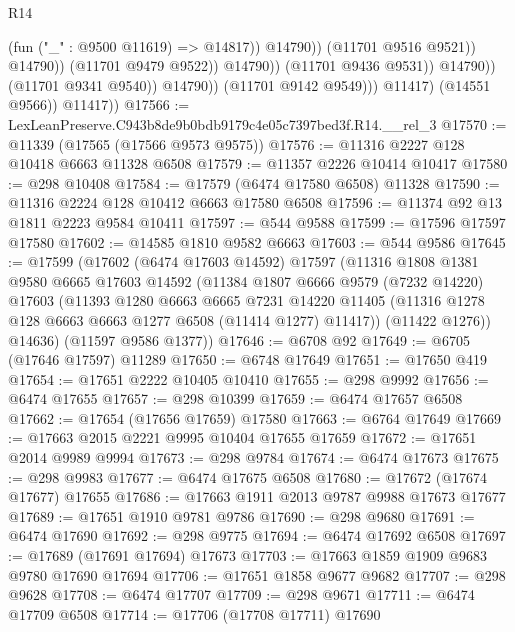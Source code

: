 \begin{lexlean}{R14}
\begin{coremodule}
                                              (fun ("_" : @9500 @11619) => @14817))
                                            @14790))
                                        (@11701 @9516 @9521))
                                      @14790))
                                  (@11701 @9479 @9522))
                                @14790))
                            (@11701 @9436 @9531))
                          @14790))
                      (@11701 @9341 @9540))
                    @14790))
                (@11701 @9142 @9549)))
            @11417)
          (@14551 @9566))
        @11417))
@17566 := LexLeanPreserve.C943b8de9b0bdb9179c4e05c7397bed3f.R14.__rel_3
@17570 := @11339 (@17565 (@17566 @9573 @9575))
@17576 := @11316 @2227 @128 @10418 @6663 @11328 @6508
@17579 := @11357 @2226 @10414 @10417
@17580 := @298 @10408
@17584 := @17579 (@6474 @17580 @6508) @11328
@17590 := @11316 @2224 @128 @10412 @6663 @17580 @6508
@17596 := @11374 @92 @13 @1811 @2223 @9584 @10411
@17597 := @544 @9588
@17599 := @17596 @17597 @17580
@17602 := @14585 @1810 @9582 @6663
@17603 := @544 @9586
@17645 := @17599
    (@17602
      (@6474 @17603 @14592)
      @17597
      (@11316
        @1808
        @1381
        @9580
        @6665
        @17603
        @14592
        (@11384
          @1807
          @6666
          @9579
          (@7232 @14220)
          @17603
          (@11393
            @1280
            @6663
            @6665
            @7231
            @14220
            @11405
            (@11316 @1278 @128 @6663 @6663 @1277 @6508 (@11414 @1277) @11417))
          (@11422 @1276))
        @14636)
      (@11597 @9586 @1377))
@17646 := @6708 @92
@17649 := @6705 (@17646 @17597) @11289
@17650 := @6748 @17649
@17651 := @17650 @419
@17654 := @17651 @2222 @10405 @10410
@17655 := @298 @9992
@17656 := @6474 @17655
@17657 := @298 @10399
@17659 := @6474 @17657 @6508
@17662 := @17654 (@17656 @17659) @17580
@17663 := @6764 @17649
@17669 := @17663 @2015 @2221 @9995 @10404 @17655 @17659
@17672 := @17651 @2014 @9989 @9994
@17673 := @298 @9784
@17674 := @6474 @17673
@17675 := @298 @9983
@17677 := @6474 @17675 @6508
@17680 := @17672 (@17674 @17677) @17655
@17686 := @17663 @1911 @2013 @9787 @9988 @17673 @17677
@17689 := @17651 @1910 @9781 @9786
@17690 := @298 @9680
@17691 := @6474 @17690
@17692 := @298 @9775
@17694 := @6474 @17692 @6508
@17697 := @17689 (@17691 @17694) @17673
@17703 := @17663 @1859 @1909 @9683 @9780 @17690 @17694
@17706 := @17651 @1858 @9677 @9682
@17707 := @298 @9628
@17708 := @6474 @17707
@17709 := @298 @9671
@17711 := @6474 @17709 @6508
@17714 := @17706 (@17708 @17711) @17690

\end{coremodule}
\end{lexlean}
